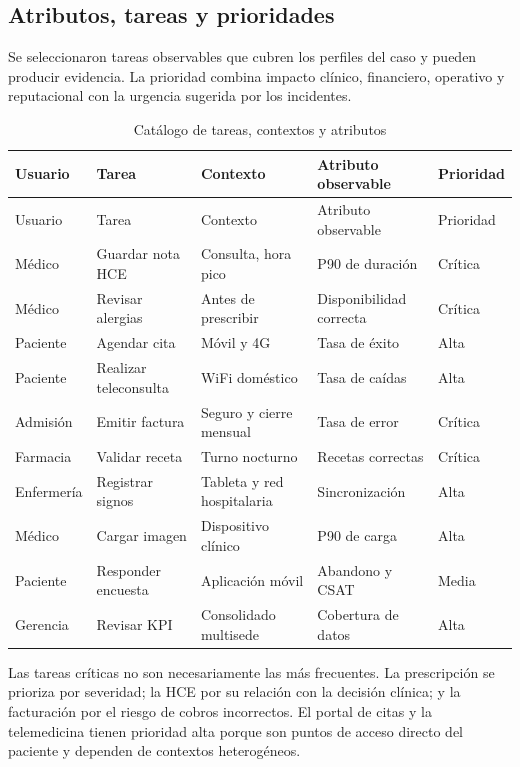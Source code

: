 \subsection{Atributos, tareas y prioridades}


Se seleccionaron tareas observables que cubren los perfiles del caso y pueden producir evidencia. La prioridad combina impacto clínico, financiero, operativo y reputacional con la urgencia sugerida por los incidentes.

\begin{longtable}{p{2.0cm}p{3.2cm}p{3.7cm}p{2.7cm}p{1.6cm}}
\caption{Catálogo de tareas, contextos y atributos}\label{tab:utc}\\
\toprule
Usuario & Tarea & Contexto & Atributo observable & Prioridad \\
\midrule
\endfirsthead
\toprule
Usuario & Tarea & Contexto & Atributo observable & Prioridad \\
\midrule
\endhead
Médico & Guardar nota HCE & Consulta, hora pico & P90 de duración & Crítica \\
Médico & Revisar alergias & Antes de prescribir & Disponibilidad correcta & Crítica \\
Paciente & Agendar cita & Móvil y 4G & Tasa de éxito & Alta \\
Paciente & Realizar teleconsulta & WiFi doméstico & Tasa de caídas & Alta \\
Admisión & Emitir factura & Seguro y cierre mensual & Tasa de error & Crítica \\
Farmacia & Validar receta & Turno nocturno & Recetas correctas & Crítica \\
Enfermería & Registrar signos & Tableta y red hospitalaria & Sincronización & Alta \\
Médico & Cargar imagen & Dispositivo clínico & P90 de carga & Alta \\
Paciente & Responder encuesta & Aplicación móvil & Abandono y CSAT & Media \\
Gerencia & Revisar KPI & Consolidado multisede & Cobertura de datos & Alta \\
\bottomrule
\end{longtable}

Las tareas críticas no son necesariamente las más frecuentes. La prescripción se prioriza por severidad; la HCE por su relación con la decisión clínica; y la facturación por el riesgo de cobros incorrectos. El portal de citas y la telemedicina tienen prioridad alta porque son puntos de acceso directo del paciente y dependen de contextos heterogéneos.

